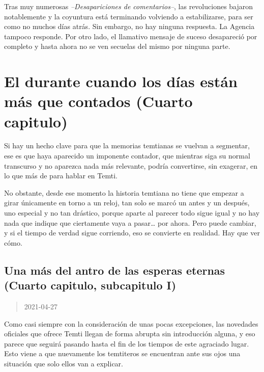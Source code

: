 \documentclass[
  spanish,
]{book}
\begin{document}
Tras muy numerosas \emph{--Desapariciones de comentarios--}, las revoluciones bajaron notablemente y la coyuntura está terminando volviendo a estabilizarse, para ser como no muchos días atrás. Sin embargo, no hay ninguna respuesta. La Agencia tampoco responde.
Por otro lado, el llamativo mensaje de suceso desapareció por completo y hasta ahora no se ven secuelas del mismo por ninguna parte.

\hypertarget{el-durante-cuando-los-duxedas-estuxe1n-muxe1s-que-contados-cuarto-capitulo}{%
\chapter{El durante cuando los días están más que contados (Cuarto capitulo)}\label{el-durante-cuando-los-duxedas-estuxe1n-muxe1s-que-contados-cuarto-capitulo}}

Si hay un hecho clave para que la memorias temtianas se vuelvan a segmentar, ese es que haya aparecido un imponente contador, que mientras siga su normal transcurso y no aparezca nada más relevante, podría convertirse, sin exagerar, en lo que más de para hablar en Temti.

No obstante, desde ese momento la historia temtiana no tiene que empezar a girar únicamente en torno a un reloj, tan solo se marcó un antes y un después, uno especial y no tan drástico, porque aparte al parecer todo sigue igual y no hay nada que indique que ciertamente vaya a pasar\ldots{} por ahora.
Pero puede cambiar, y si el tiempo de verdad sigue corriendo, eso se convierte en realidad. Hay que ver cómo.

\hypertarget{una-muxe1s-del-antro-de-las-esperas-eternas-cuarto-capitulo-subcapitulo-i}{%
\section{Una más del antro de las esperas eternas (Cuarto capitulo, subcapitulo I)}\label{una-muxe1s-del-antro-de-las-esperas-eternas-cuarto-capitulo-subcapitulo-i}}

\begin{quote}
2021-04-27
\end{quote}

Como casi siempre con la consideración de unas pocas excepciones, las novedades oficiales que ofrece Temti llegan de forma abrupta sin introducción alguna, y eso parece que seguirá pasando hasta el fin de los tiempos de este agraciado lugar. Esto viene a que nuevamente los temtiteros se encuentran ante sus ojos una situación que solo ellos van a explicar.
\end{document}
